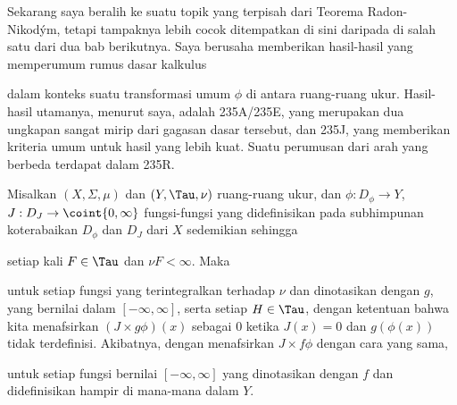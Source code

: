 
\def\chaptername{Teorema Radon-Nikod\'ym}
\def\sectionname{Transformasi terukur}
\def\tildeTau{\tilde{\text{T}}}


Sekarang saya beralih ke suatu topik yang terpisah dari Teorema
Radon-Nikod\'ym, tetapi tampaknya lebih cocok ditempatkan di sini daripada
di salah satu dari dua bab berikutnya. Saya berusaha memberikan
hasil-hasil yang memperumum rumus dasar kalkulus


\noindent dalam konteks suatu transformasi umum $\phi$ di antara
ruang-ruang ukur. Hasil-hasil utamanya, menurut saya, adalah 235A/235E,
yang merupakan dua ungkapan sangat mirip dari gagasan dasar tersebut,
dan 235J, yang memberikan kriteria umum untuk hasil yang lebih kuat.
Suatu perumusan dari arah yang berbeda terdapat dalam 235R.

 Misalkan $(X,\Sigma,\mu)$ dan $(Y,\Tau,\nu)$
ruang-ruang ukur, dan $\phi:D_{\phi}\to Y$,
$J:D_J\to\coint{0,\infty}$ fungsi-fungsi yang didefinisikan pada
subhimpunan koterabaikan $D_{\phi}$ dan $D_J$ dari $X$ sedemikian sehingga


\noindent setiap kali $F\in\Tau$ dan $\nu F<\infty$. Maka


\noindent untuk setiap fungsi yang terintegralkan terhadap $\nu$ dan
dinotasikan dengan $g$, yang bernilai dalam $[-\infty,\infty]$, serta
setiap $H\in\Tau$, dengan ketentuan
bahwa kita
menafsirkan $(J\times g\phi)(x)$ sebagai $0$ ketika $J(x)=0$ dan
$g(\phi(x))$ tidak terdefinisi. Akibatnya, dengan menafsirkan
$J\times f\phi$ dengan cara yang sama,


\noindent untuk setiap fungsi bernilai $[-\infty,\infty]$ yang dinotasikan
dengan $f$ dan didefinisikan hampir di mana-mana dalam $Y$.

